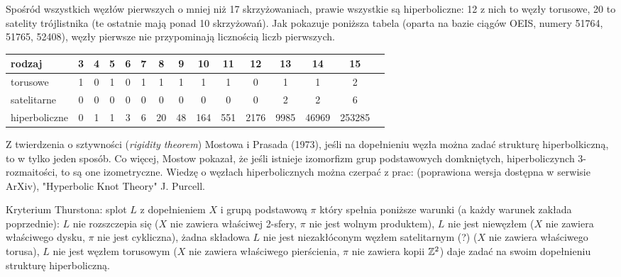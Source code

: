 Spośród wszystkich węzłów pierwszych o mniej niż 17 skrzyżowaniach, prawie wszystkie są hiperboliczne: 12 z nich to węzły torusowe, 20 to satelity trójlistnika (te ostatnie mają ponad 10 skrzyżowań).
Jak pokazuje poniższa tabela (oparta na bazie ciągów OEIS, numery 51764, 51765, 52408), węzły pierwsze nie przypominają licznością liczb pierwszych.

\renewcommand*{\arraystretch}{1.4}
\footnotesize
\begin{longtable}{lcccccccccccccc}
\hline
    \textbf{rodzaj} & 3 & 4 & 5 & 6 & 7 & 8  & 9  & 10  & 11  & 12   & 13   & 14    & 15     \\ \hline \endhead
    torusowe        & 1 & 0 & 1 & 0 & 1 & 1  & 1  & 1   & 1   & 0    & 1    & 1     & 2      \\
    satelitarne     & 0 & 0 & 0 & 0 & 0 & 0  & 0  & 0   & 0   & 0    & 2    & 2     & 6      \\
    hiperboliczne   & 0 & 1 & 1 & 3 & 6 & 20 & 48 & 164 & 551 & 2176 & 9985 & 46969 & 253285 \\
    \hline
\end{longtable}
\normalsize


Z twierdzenia o sztywności (\emph{rigidity theorem}) Mostowa i Prasada (1973), jeśli na dopełnieniu węzła można zadać strukturę hiperbolkiczną, to w tylko jeden sposób.
Co więcej, Mostow pokazał, że jeśli istnieje izomorfizm grup podstawowych domkniętych, hiperboliczynch 3-rozmaitości, to są one izometryczne.
Wiedzę o węzłach hiperbolicznych można czerpać z prac: \cite{weeks05} (poprawiona wersja dostępna w serwisie ArXiv), "Hyperbolic Knot Theory" J. Purcell.

Kryterium Thurstona: splot $L$ z dopełnieniem $X$ i grupą podstawową $\pi$ który spełnia poniższe warunki (a każdy warunek zakłada poprzednie): $L$ nie rozszczepia się ($X$ nie zawiera właściwej 2-sfery, $\pi$ nie jest wolnym produktem), $L$ nie jest niewęzłem ($X$ nie zawiera właściwego dysku, $\pi$ nie jest cykliczna), żadna składowa $L$ nie jest niezakłóconym węzłem satelitarnym (?) ($X$ nie zawiera właściwego torusa), $L$ nie jest węzłem torusowym ($X$ nie zawiera właściwego pierścienia, $\pi$ nie zawiera kopii $\mathbb Z^2$) daje zadać na swoim dopełnieniu strukturę hiperboliczną.
